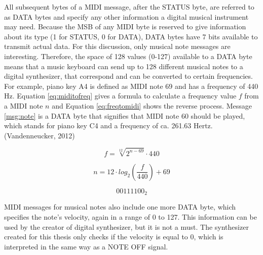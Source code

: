 \documentclass[12pt,twoside]{report}
\begin{document}


\pagebreak

\noindent All subsequent bytes of a MIDI message, after the STATUS byte, are referred to as DATA bytes and specify any other information a digital musical instrument may need. Because the MSB of any MIDI byte is reserved to give information about its type (1 for STATUS, 0 for DATA), DATA bytes have 7 bits available to transmit actual data. For this discussion, only musical note messages are interesting. Therefore, the space of 128 values (0-127) available to a DATA byte means that a music keyboard can send up to 128 different musical notes to a digital synthesizer, that correspond and can be converted to certain frequencies. For example, piano key A4 is defined as MIDI note 69 and has a frequency of 440 Hz. Equation \ref{eq:miditofreq} gives a formula to calculate a frequency value $f$ from a MIDI note $n$ and Equation \ref{eq:freqtomidi} shows the reverse process. Message \ref{msg:note} is a DATA byte that signifies that MIDI note 60 should be played, which stands for piano key C4 and a frequency of ca. 261.63 Hertz. (Vandenneucker, 2012)

\begin{equation}
  f = \sqrt[12]{2^{n-69}} \cdot 440
  \label{eq:miditofreq}
  \end{equation}

\begin{equation}
  n = 12 \cdot log_{2}(\frac{f}{440}) + 69
  \label{eq:freqtomidi}
\end{equation}

\begin{equation}
  {00111100}_{2}
  \label{msg:note}
\end{equation}

\noindent MIDI messages for musical notes also include one more DATA byte, which specifies the note's velocity, again in a range of 0 to 127. This information can be used by the creator of digital synthesizer, but it is not a must. The synthesizer created for this thesis only checks if the velocity is equal to 0, which is interpreted in the same way as a NOTE OFF signal.
\end{document}
